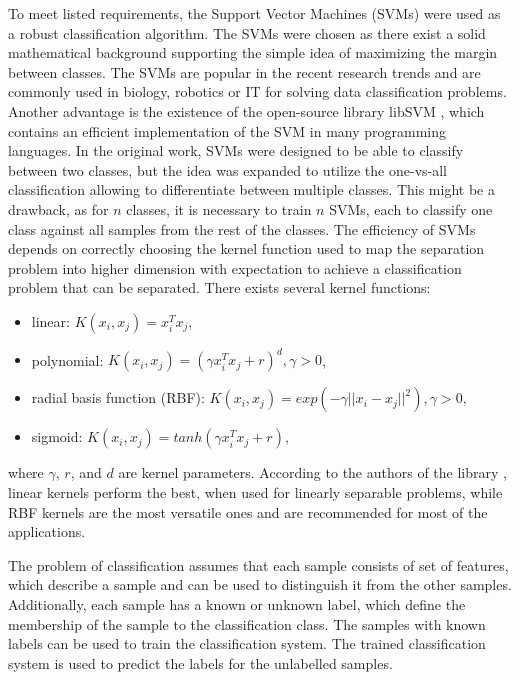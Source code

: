 To meet listed requirements, the Support Vector Machines (SVMs)\cite{Cortes:SVM} were used as a robust classification algorithm.
The SVMs were chosen as there exist a solid mathematical background supporting the simple idea of maximizing the margin between classes.
The SVMs are popular in the recent research trends and are commonly used in biology, robotics or IT for solving data classification problems.
Another advantage is the existence of the open-source library libSVM \cite{libSVM}, which contains an efficient implementation of the SVM in many programming languages.
In the original work, SVMs were designed to be able to classify between two classes, but the idea was expanded to utilize the one-vs-all classification allowing to differentiate between multiple classes.
This might be a drawback, as for $n$ classes, it is necessary to train $n$ SVMs, each to classify one class against all samples from the rest of the classes. 
The efficiency of SVMs depends on correctly choosing the kernel function used to map the separation problem into higher dimension with expectation to achieve a classification problem that can be separated.
There exists several kernel functions:
\begin{itemize}
\item linear: $K(x_i, x_j) = x_i^Tx_j$,
\item polynomial: $K(x_i, x_j) = (\gamma x_i^Tx_j + r)^d, \gamma > 0$,
\item radial basis function (RBF): $K(x_i, x_j) = exp(-\gamma ||x_i - x_j||^2), \gamma > 0$,
\item sigmoid: $K(x_i, x_j) = tanh(\gamma x_i^Tx_j+r)$,
\end{itemize}
where $\gamma$, $r$, and $d$ are kernel parameters. 
According to the authors of the library \cite{libSVM}, linear kernels perform the best, when used for linearly separable problems, while RBF kernels are the most versatile ones and are recommended for most of the applications.


The problem of classification assumes that each sample consists of set of features, which describe a sample and can be used to distinguish it from the other samples.
Additionally, each sample has a known or unknown label, which define the membership of the sample to the classification class. 
The samples with known labels can be used to train the classification system.
The trained classification system is used to predict the labels for the unlabelled samples.

